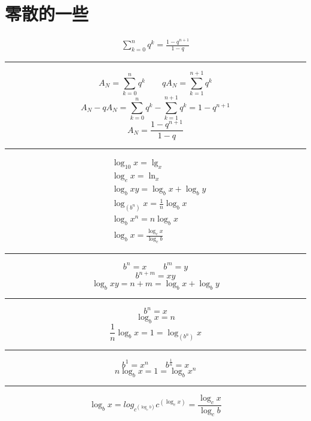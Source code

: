 \section{零散的一些}
\begin{align}
\sum\limits_{k=0}^{n}q^k = \frac{1-q^{n+1}}{1-q}
\end{align}
\noindent\rule{\textwidth}{0.4pt}
$$A_N = \sum\limits_{k = 0}^{n}q^k \qquad qA_N = \sum\limits_{k = 1}^{n+1}q^k$$
$$A_N - qA_N = \sum\limits_{k = 0}^{n}q^k -\sum\limits_{k=1}^{n+1}q^k = 1-q^{n+1}$$
$$A_N = \frac{1-q^{n+1}}{1-q}$$
\noindent\rule{\textwidth}{0.4pt}

\begin{align}
&\log_{10}{x} = \lg_{x} \\
&\log_{e}{x} = \ln_{x}\\
&\log_{b}{xy} = \log_{b}{x} + \log_{b}{y}\\
&\log_{\left(b^n\right)}{x} = \frac{1}{n}\log_{b}{x} \\
&\log_{b}{x^n} = n\log_{b}{x} \\
&\log_{b}{x} = \frac{\log_{c}{x}}{\log_{c}{b}}
\end{align}
\noindent\rule{\textwidth}{0.4pt}
$$b^n = x\qquad b^m =y$$
$$b^{n+m} = xy$$
$$\log_{b}{xy} = n + m = \log_{b}{x} + \log_{b}{y}$$
\noindent\rule{\textwidth}{0.4pt}
$$b^n = x$$
$$\log_{b}{x} = n$$
$$\frac{1}{n}\log_{b}{x}= 1 = \log_{\left(b^n\right)}{x}$$
\noindent\rule[\fill]{\textwidth}{0.4pt}
$$b^1 = x^n \qquad b^{\frac{1}{n}} = x$$
$$n\log_{b}{x} = 1 = \log_{b}{x^n}$$
\noindent\rule[\fill]{\textwidth}{0.4pt}
$$\log_{b}{x} = log_{c^{\left(\log_{c}{b}\right)}}{c^{\left(\log_{c}{x}\right)}}=\frac{\log_{c}{x}}{\log_{c}{b}}$$
